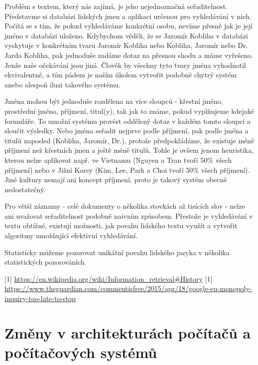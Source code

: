 \documentclass[12pt,letterpaper,oneside,openright]{book}
\begin{document}
Problém s textem, který nás zajímá, je jeho nejednoznačná seřaditelnost.
Představme si databázi lidských jmen a aplikaci určenou pro vyhledávání v nich.
Počítá se s tím, že pokud vyhledáváme konkrétní osobu, nevíme přesně jak je
její jméno v databázi uloženo. Kdybychom věděli, že se Jaromír Kobliha v
databázi vyskytuje v konkrétním tvaru Jaromír Kobliha nebo Kobliha, Jaromír
nebo Dr. Jarda Kobliha, pak jednoduše zadáme dotaz na přesnou shodu a máme
vyřešeno. Jenže naše očekávání jsou jiná. Člověk by všechny tyto tvary jména
vyhodnotil ekvivalentně, a tím pádem je naším úkolem vytvořit podobně chytrý
systém anebo alespoň iluzi takového systému.

Jména mohou být jednoduše rozdělena na více sloupců - křestní jméno, prostřední
jméno, příjmení, titul(y), tak jak to známe, pokud vyplňujeme kdejaké
formuláře. To umožní systému provést oddělený dotaz v každém tomto sloupci a
sloučit výsledky. Nebo jména seřadit nejprve podle příjmení, pak podle jména a
titulů naposled (Kobliha, Jaromír, Dr.), protože předpokládáme, že existuje
méně příjmení než křestních jmen a ještě méně titulů. Tohle je ovšem jenom
heuristika, kterou nelze aplikovat např. ve Vietnamu (Nguyen a Tran tvoří 50\%
všech příjmení) nebo v Jižní Korey (Kim, Lee, Park a Choi tvoří 50\% všech
příjmení). Jiné kultury nemají ani koncept příjmení, proto je takový systém
obecně nedostatečný.

Pro větší záznamy - celé dokumenty o několika stovkách až tisících slov - nelze
ani uvažovat seřaditelnost podobně naivním způsobem. Přestože je vyhledávání v
textu obtížné, existují možnosti, jak povahu lidského textu využít a vytvořit
algoritmy umožňující efektivní vyhledávání.

Statisticky můžeme pozorovat unikátní povahu lidského jazyka v několika statistických pozorováních.

[1] \url{https://en.wikipedia.org/wiki/Information_retrieval#History}
[1] \url{https://www.theguardian.com/commentisfree/2015/apr/18/google-eu-monopoly-inquiry-too-late-to-stop}


\section{Změny v architekturách počítačů a počítačových systémů}
\end{document}
